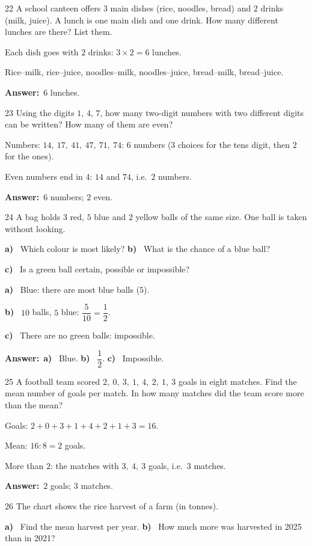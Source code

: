 \documentclass[11pt]{article}
\newif\ifsol \solfalse
\providecommand{\AnsWord}{Đáp số}
\newcommand{\dapso}[1]{\par\textbf{\AnsWord:}\ #1}
\newcommand{\probsol}[1]{%
  \begin{lrbox}{\solmeasure}\begin{minipage}{\dimexpr\linewidth-24pt\relax}#1\end{minipage}\end{lrbox}%
  \ifsol
    \begin{solbox}#1\end{solbox}%
  \else
    \setlength{\solht}{\dimexpr\ht\solmeasure+\dp\solmeasure+0.85cm\relax}%
    \ifdim\solht<1.35cm\setlength{\solht}{1.35cm}\fi
    \begin{tcolorbox}[colback=white,colframe=Line,boxrule=0.8pt,arc=5pt,
      left=8pt,right=8pt,top=4pt,bottom=4pt,height=\solht]{\footnotesize\color{Slate}\itshape\WorkWord}\end{tcolorbox}%
  \fi}
\newcommand{\pa}[1]{\textbf{#1)}\ }
\newcommand{\gap}{\vspace{0.3cm}}
\def\WorkWord{Your work:}
\def\AnsWord{Answer}
\begin{document}
\gap
\begin{probbox}{22}{\relax}
A school canteen offers $3$ main dishes (rice, noodles, bread) and $2$ drinks (milk, juice). A lunch is one main dish and one drink. How many different lunches are there? List them.
\end{probbox}
\probsol{
Each dish goes with $2$ drinks: $3\times2=6$ lunches.\par
Rice--milk, rice--juice, noodles--milk, noodles--juice, bread--milk, bread--juice.
\dapso{$6$ lunches.}}
\gap
\begin{probbox}{23}{\relax}
Using the digits $1$, $4$, $7$, how many two-digit numbers with two different digits can be written? How many of them are even?
\end{probbox}
\probsol{
Numbers: $14,\ 17,\ 41,\ 47,\ 71,\ 74$: $6$ numbers ($3$ choices for the tens digit, then $2$ for the ones).\par
Even numbers end in $4$: $14$ and $74$, i.e.\ $2$ numbers.
\dapso{$6$ numbers; $2$ even.}}
\gap
\begin{probbox}{24}{\relax}
A bag holds $3$ red, $5$ blue and $2$ yellow balls of the same size. One ball is taken without looking.\par
\pa{a} Which colour is most likely? \quad \pa{b} What is the chance of a blue ball?\par
\pa{c} Is a green ball certain, possible or impossible?
\end{probbox}
\probsol{
\pa{a} Blue: there are most blue balls ($5$).\par
\pa{b} $10$ balls, $5$ blue: $\dfrac{5}{10}=\dfrac12$.\par
\pa{c} There are no green balls: impossible.
\dapso{\pa{a} Blue. \pa{b} $\dfrac12$. \pa{c} Impossible.}}
\gap
\begin{probbox}{25}{\relax}
A football team scored $2,\ 0,\ 3,\ 1,\ 4,\ 2,\ 1,\ 3$ goals in eight matches. Find the mean number of goals per match. In how many matches did the team score more than the mean?
\end{probbox}
\probsol{
Goals: $2+0+3+1+4+2+1+3=16$.\par Mean: $16:8=2$ goals.\par More than $2$: the matches with $3,\ 4,\ 3$ goals, i.e.\ $3$ matches.
\dapso{$2$ goals; $3$ matches.}}
\gap
\needspace{8.5cm}
\begin{probbox}{26}{\relax}
The chart shows the rice harvest of a farm (in tonnes).
\begin{center}
\end{center}
\pa{a} Find the mean harvest per year. \quad \pa{b} How much more was harvested in 2025 than in 2021?
\end{probbox}
\end{document}
